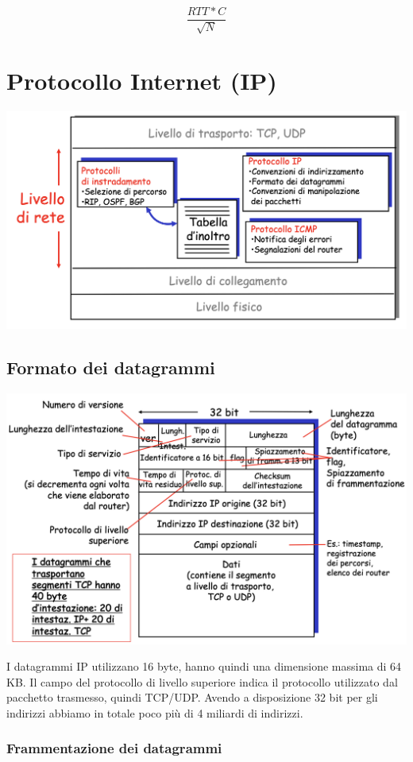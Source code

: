 \documentclass{report}
\begin{document}
\[\frac{RTT*C}{\sqrt{N}}\]

\hypertarget{header-n86}{%
\section{Protocollo Internet (IP)}\label{header-n86}}

\begin{center}
		\includegraphics[width=0.7\linewidth]{liv-rete}
	\end{center}

\hypertarget{header-n88}{%
\subsection{Formato dei datagrammi}\label{header-n88}}

\begin{center}
		\includegraphics[width=0.7\linewidth]{datagram-ip}
	\end{center}

I datagrammi IP utilizzano 16 byte, hanno quindi una dimensione massima
di 64 KB. Il campo del protocollo di livello superiore indica il
protocollo utilizzato dal pacchetto trasmesso, quindi TCP/UDP. Avendo a
disposizione 32 bit per gli indirizzi abbiamo in totale poco più di 4
miliardi di indirizzi.

\hypertarget{header-n91}{%
\subsubsection{Frammentazione dei datagrammi}\label{header-n91}}
\end{document}
